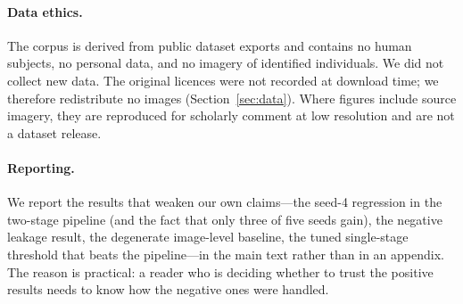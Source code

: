 \paragraph{Data ethics.} The corpus is derived from public dataset exports and
contains no human subjects, no personal data, and no imagery of identified
individuals. We did not collect new data. The original licences were not recorded
at download time; we therefore redistribute no images (Section~\ref{sec:data}).
Where figures include source imagery, they are reproduced for scholarly comment
at low resolution and are not a dataset release.

\paragraph{Reporting.} We report the results that weaken our own claims---the
seed-4 regression in the two-stage pipeline (and the fact that only three of five
seeds gain), the negative leakage result, the degenerate image-level baseline,
the tuned single-stage threshold that beats the pipeline---in the main text rather
than in an appendix. The reason is practical: a reader who is deciding whether to
trust the positive results needs to know how the negative ones were handled.
